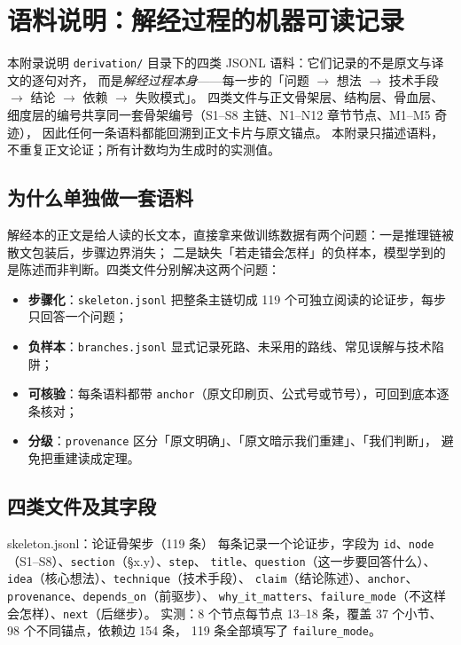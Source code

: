 
\section{语料说明：解经过程的机器可读记录}

本附录说明 \texttt{derivation/} 目录下的四类 JSONL 语料：它们记录的不是原文与译文的逐句对齐，
而是\emph{解经过程本身}——每一步的「问题 $\to$ 想法 $\to$ 技术手段 $\to$ 结论 $\to$ 依赖 $\to$ 失败模式」。
四类文件与正文骨架层、结构层、骨血层、细度层的编号共享同一套骨架编号（S1--S8 主链、N1--N12 章节节点、M1--M5 奇迹），
因此任何一条语料都能回溯到正文卡片与原文锚点。\pA
本附录只描述语料，不重复正文论证；所有计数均为生成时的实测值。

\subsection{为什么单独做一套语料}

解经本的正文是给人读的长文本，直接拿来做训练数据有两个问题：一是推理链被散文包装后，步骤边界消失；
二是缺失「若走错会怎样」的负样本，模型学到的是陈述而非判断。四类文件分别解决这两个问题：

\begin{itemize}
\item \textbf{步骤化}：\texttt{skeleton.jsonl} 把整条主链切成 119 个可独立阅读的论证步，每步只回答一个问题；
\item \textbf{负样本}：\texttt{branches.jsonl} 显式记录死路、未采用的路线、常见误解与技术陷阱；
\item \textbf{可核验}：每条语料都带 \texttt{anchor}（原文印刷页、公式号或节号），可回到底本逐条核对；
\item \textbf{分级}：\texttt{provenance} 区分「原文明确」\pA、「原文暗示我们重建」\pB、「我们判断」\pC，
  避免把重建读成定理。
\end{itemize}

\subsection{四类文件及其字段}

\begin{kcard}{skeleton.jsonl：论证骨架步（119 条）}
每条记录一个论证步，字段为 \texttt{id}、\texttt{node}（S1--S8）、\texttt{section}（\S x.y）、\texttt{step}、
\texttt{title}、\texttt{question}（这一步要回答什么）、\texttt{idea}（核心想法）、\texttt{technique}（技术手段）、
\texttt{claim}（结论陈述）、\texttt{anchor}、\texttt{provenance}、\texttt{depends\_on}（前驱步）、
\texttt{why\_it\_matters}、\texttt{failure\_mode}（不这样会怎样）、\texttt{next}（后继步）。
实测：8 个节点每节点 13--18 条，覆盖 37 个小节、98 个不同锚点，依赖边 154 条，
119 条全部填写了 \texttt{failure\_mode}。\pA
\end{kcard}

